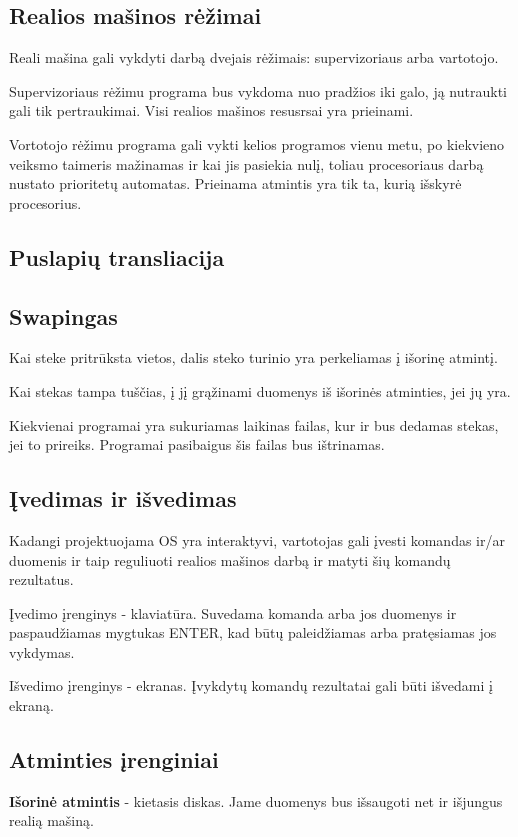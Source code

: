 \documentclass[12pt]{article}
\begin{document}
	\subsection{Realios mašinos rėžimai}
	Reali mašina gali vykdyti darbą dvejais rėžimais: supervizoriaus arba vartotojo. 
	
	Supervizoriaus rėžimu programa bus vykdoma nuo pradžios iki galo, ją nutraukti gali tik pertraukimai. Visi realios mašinos resusrsai yra prieinami.
	
	Vortotojo rėžimu programa gali vykti kelios programos vienu metu, po kiekvieno veiksmo taimeris mažinamas ir kai jis pasiekia nulį, toliau procesoriaus darbą nustato prioritetų automatas. Prieinama atmintis yra tik ta, kurią išskyrė procesorius.
	
	\subsection{Puslapių transliacija}
	
	\subsection{Swapingas}
	Kai steke pritrūksta vietos, dalis steko turinio yra perkeliamas į išorinę atmintį.
	
	Kai stekas tampa tuščias, į jį grąžinami duomenys iš išorinės atminties, jei jų yra.
	
	Kiekvienai programai yra sukuriamas laikinas failas, kur ir bus dedamas stekas, jei to prireiks. Programai pasibaigus šis failas bus ištrinamas.
	
	\subsection{Įvedimas ir išvedimas}
	Kadangi projektuojama OS yra interaktyvi, vartotojas gali įvesti komandas ir/ar duomenis ir taip reguliuoti realios mašinos darbą ir matyti šių komandų rezultatus.
	
	Įvedimo įrenginys - klaviatūra. Suvedama komanda arba jos duomenys ir paspaudžiamas mygtukas ENTER, kad būtų paleidžiamas arba pratęsiamas jos vykdymas.
	
	Išvedimo įrenginys - ekranas. Įvykdytų komandų rezultatai gali būti išvedami į ekraną.
	
	\subsection{Atminties įrenginiai}
	\textbf{Išorinė atmintis} - kietasis diskas. Jame duomenys bus išsaugoti net ir išjungus realią mašiną.
	
\end{document}

